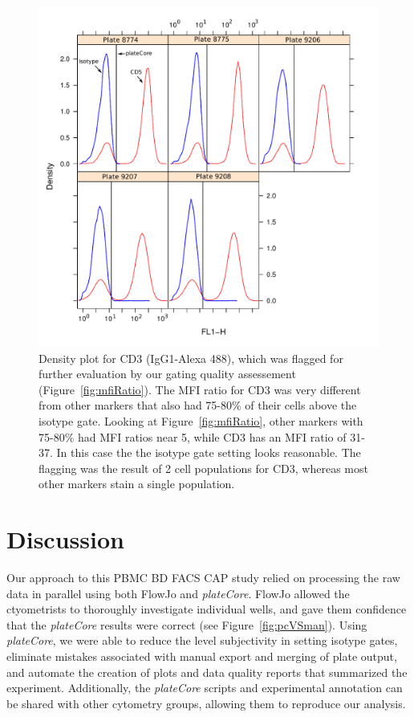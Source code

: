 \documentclass[12pt]{article}
\newcommand{\Rpackage}[1]{{\textit{#1}}}
\begin{document}
\begin{figure}
\centering
\includegraphics{mfiRatio2.pdf}
\caption{Density plot for CD3 (IgG1-Alexa 488), which was flagged for further
evaluation by our gating quality assessement (Figure~\ref{fig:mfiRatio}).
The MFI ratio for CD3 was very different from other markers that also had
75-80\% of their cells above the isotype gate. Looking at
Figure~\ref{fig:mfiRatio}, other markers with 75-80\% had MFI ratios near 5,
while CD3 has an MFI ratio of 31-37. In this case the the isotype
gate setting looks reasonable. The flagging was the result of 2 cell
populations for CD3, whereas most other markers stain a single population.
}
\label{fig:mfiRatio3}
\end{figure}

\clearpage
\section*{Discussion}

Our approach to this PBMC BD FACS CAP study relied on processing the raw data
in parallel using both FlowJo and \Rpackage{plateCore}. FlowJo allowed the
ctyometrists to thoroughly investigate individual wells, and gave them
confidence that the \Rpackage{plateCore} results were correct (see
Figure~\ref{fig:pcVSman}). Using \Rpackage{plateCore}, we were able to reduce
the level subjectivity in setting isotype gates, eliminate mistakes associated
with manual export and merging of plate output, and automate the creation of
plots and data quality reports that summarized the experiment. Additionally,
the \Rpackage{plateCore} scripts and experimental annotation can be shared with
other cytometry groups, allowing them to reproduce our analysis.
\end{document}
